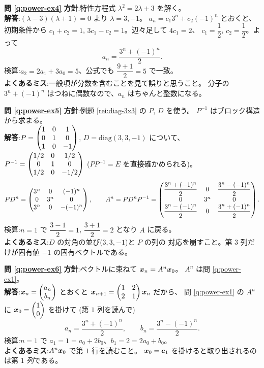 \bigskip
\noindent\textbf{問 \ref{q:power-ex4}}\quad
\textbf{方針}:特性方程式 $\lambda^2 = 2\lambda + 3$ を解く。\\
\textbf{解答}:$(\lambda - 3)(\lambda + 1) = 0$ より $\lambda = 3, -1$。
$a_n = c_1 3^n + c_2 (-1)^n$ とおくと、初期条件から
$c_1 + c_2 = 1$, $3c_1 - c_2 = 1$。辺々足して $4c_1 = 2$、
$c_1 = \dfrac{1}{2}$, $c_2 = \dfrac{1}{2}$。よって
\[
a_n = \frac{3^n + (-1)^n}{2}.
\]
検算:$a_2 = 2a_1 + 3a_0 = 5$、公式でも $\dfrac{9 + 1}{2} = 5$ で一致。\\
\textbf{よくあるミス}:一般項が分数を含むことを見て誤りと思うこと。
分子の $3^n + (-1)^n$ はつねに偶数なので、$a_n$ はちゃんと整数になる。

\bigskip
\noindent\textbf{問 \ref{q:power-ex5}}\quad
\textbf{方針}:例題 \ref{rei:diag-3x3} の $P$, $D$ を使う。
$P^{-1}$ はブロック構造から求まる。\\
\textbf{解答}:$P = \begin{pmatrix}1 & 0 & 1 \\ 0 & 1 & 0 \\ 1 & 0 & -1\end{pmatrix}$,
$D = \mathrm{diag}(3, 3, -1)$ について、
$P^{-1} = \begin{pmatrix}1/2 & 0 & 1/2 \\ 0 & 1 & 0 \\ 1/2 & 0 & -1/2\end{pmatrix}$
($PP^{-1} = E$ を直接確かめられる)。
\[
PD^n = \begin{pmatrix}3^n & 0 & (-1)^n \\ 0 & 3^n & 0 \\ 3^n & 0 & -(-1)^n\end{pmatrix},
\qquad
A^n = PD^nP^{-1} = \begin{pmatrix}\dfrac{3^n + (-1)^n}{2} & 0 & \dfrac{3^n - (-1)^n}{2} \\
0 & 3^n & 0 \\
\dfrac{3^n - (-1)^n}{2} & 0 & \dfrac{3^n + (-1)^n}{2}\end{pmatrix}.
\]
検算:$n = 1$ で $\dfrac{3 - 1}{2} = 1$, $\dfrac{3 + 1}{2} = 2$ となり
$A$ に戻る。\\
\textbf{よくあるミス}:$D$ の対角の並び($3, 3, -1$)と $P$ の列の
対応を崩すこと。第 $3$ 列だけが固有値 $-1$ の固有ベクトルである。

\bigskip
\noindent\textbf{問 \ref{q:power-ex6}}\quad
\textbf{方針}:ベクトルに束ねて $\bm{x}_n = A^n\bm{x}_0$。
$A^n$ は問 \ref{q:power-ex1}。\\
\textbf{解答}:$\bm{x}_n = \begin{pmatrix}a_n \\ b_n\end{pmatrix}$ とおくと
$\bm{x}_{n+1} = \begin{pmatrix}1 & 2 \\ 2 & 1\end{pmatrix}\bm{x}_n$ だから、
問 \ref{q:power-ex1} の $A^n$ に $\bm{x}_0 = \begin{pmatrix}1 \\ 0\end{pmatrix}$ を掛けて
(第 $1$ 列を読んで)
\[
a_n = \frac{3^n + (-1)^n}{2}, \qquad b_n = \frac{3^n - (-1)^n}{2}.
\]
検算:$n = 1$ で $a_1 = 1 = a_0 + 2b_0$、$b_1 = 2 = 2a_0 + b_0$。\\
\textbf{よくあるミス}:$A^n\bm{x}_0$ で第 $1$ 行を読むこと。
$\bm{x}_0 = \bm{e}_1$ を掛けると取り出されるのは第 $1$ \emph{列}である。

